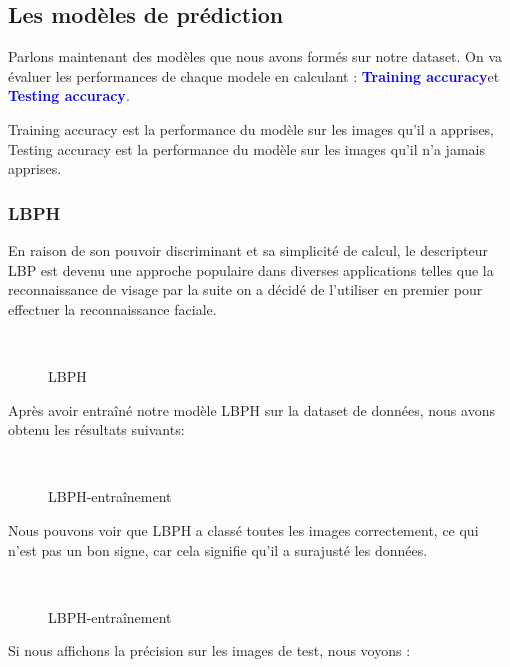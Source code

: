 {\subsection{Les modèles de prédiction}
Parlons maintenant des modèles que nous avons formés sur notre dataset. On va évaluer les performances de chaque modele en calculant :  \textbf{\textcolor{blue}{Training accuracy}}et \textbf{\textcolor{blue}{Testing accuracy}}.

Training accuracy est la performance du modèle sur les images qu'il a apprises, Testing accuracy est la performance du modèle sur les images qu'il n'a jamais apprises.
\subsubsection{LBPH}
En raison de son pouvoir discriminant et sa   simplicité de calcul, le descripteur LBP est devenu une approche populaire dans diverses applications telles que la reconnaissance de visage par la suite on a décidé de l’utiliser en premier  pour effectuer la reconnaissance faciale.

\begin{figure}[H] 
\centering
{}\\[0.5cm]
\caption{LBPH}
\label{fig:figure5}
\end{figure}


Après avoir entraîné notre modèle LBPH sur la dataset de données, nous avons obtenu les résultats suivants:
\begin{figure}[H] 
\centering
{}\\[0.5cm]
\caption{LBPH-entraînement}
\label{fig:figure14}
\end{figure}

Nous pouvons voir que LBPH a classé toutes les images correctement, ce qui n'est pas un bon signe, car cela signifie qu'il a surajusté les données.
\begin{figure}[H] 
\centering
{}\\[0.5cm]
\caption{LBPH-entraînement}
\label{fig:figure14}
\end{figure}
Si nous affichons la précision sur les images de test, nous voyons :

}

